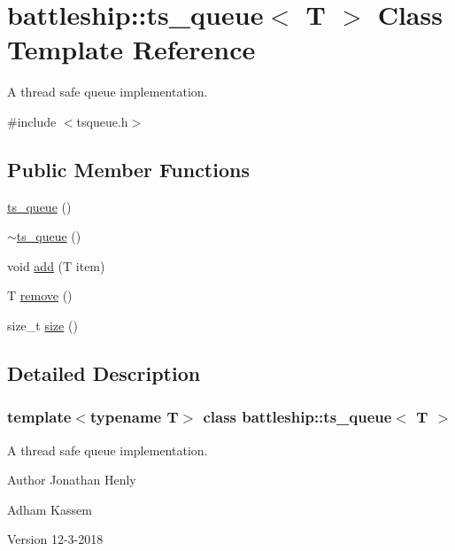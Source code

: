 \hypertarget{classbattleship_1_1ts__queue}{}\section{battleship\+:\+:ts\+\_\+queue$<$ T $>$ Class Template Reference}
\label{classbattleship_1_1ts__queue}


A thread safe queue implementation.  




{\ttfamily \#include $<$tsqueue.\+h$>$}

\subsection*{Public Member Functions}
\begin{DoxyCompactItemize}
\item 
\hyperlink{classbattleship_1_1ts__queue_a8c5d650bd3c8da2226a93ef16eddf259}{ts\+\_\+queue} ()
\item 
\hyperlink{classbattleship_1_1ts__queue_ad1dcfe27a6218886353c17c9334a4232}{$\sim$ts\+\_\+queue} ()
\item 
void \hyperlink{classbattleship_1_1ts__queue_accbd5de0ef9994e7b99f2e9113a36677}{add} (T item)
\item 
T \hyperlink{classbattleship_1_1ts__queue_aa6ec6739ad7f1768068cb1f7d5957b2f}{remove} ()
\item 
size\+\_\+t \hyperlink{classbattleship_1_1ts__queue_a45ee4b66d4e5da270559887775659c6f}{size} ()
\end{DoxyCompactItemize}


\subsection{Detailed Description}
\subsubsection*{template$<$typename T$>$\newline
class battleship\+::ts\+\_\+queue$<$ T $>$}

A thread safe queue implementation. 

\begin{DoxyAuthor}{Author}
Jonathan Henly 

Adham Kassem 
\end{DoxyAuthor}
\begin{DoxyVersion}{Version}
12-\/3-\/2018 
\end{DoxyVersion}


